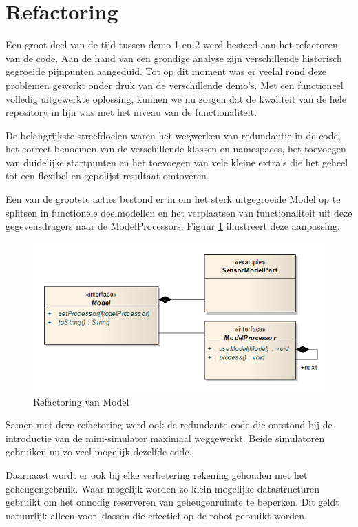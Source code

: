 \documentclass[12pt,a4paper]{report}
\begin{document}
\section{Refactoring}

Een groot deel van de tijd tussen demo 1 en 2 werd besteed aan het refactoren van de code. Aan de hand van een grondige analyse zijn verschillende historisch gegroeide pijnpunten aangeduid. Tot op dit moment was er veelal rond deze problemen gewerkt onder druk van de verschillende demo's. Met een functioneel volledig uitgewerkte oplossing, kunnen we nu zorgen dat de kwaliteit van de hele repository in lijn was met het niveau van de functionaliteit.

De belangrijkste streefdoelen waren het wegwerken van redundantie in de code, het correct benoemen van de verschillende klassen en namespaces, het toevoegen van duidelijke startpunten en het toevoegen van vele kleine extra's die het geheel tot een flexibel en gepolijst resultaat omtoveren.

Een van de grootste acties bestond er in om het sterk uitgegroeide Model op te splitsen in functionele deelmodellen en het verplaatsen van functionaliteit uit deze gegevensdragers naar de ModelProcessors. Figuur \ref{uml:refactoring} illustreert deze aanpassing.

\begin{figure}[htbp]
  \centering
  \includegraphics[width=120mm]{resources/refactoring-model.png}
  \caption{Refactoring van Model}
  \label{uml:refactoring}
\end{figure}

Samen met deze refactoring werd ook de redundante code die ontstond bij de introductie van de mini-simulator maximaal weggewerkt. Beide simulatoren gebruiken nu zo veel mogelijk dezelfde code.

Daarnaast wordt er ook bij elke verbetering rekening gehouden met het geheugengebruik. Waar mogelijk worden zo klein mogelijke datastructuren gebruikt om het onnodig reserveren van geheugenruimte te beperken. Dit geldt natuurlijk alleen voor klassen die effectief op de robot gebruikt worden.
\end{document}
